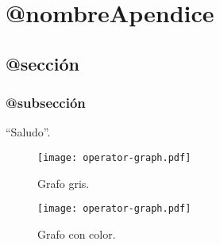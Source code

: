 \chapter{@nombreApendice}
\label{ad:A}


\section{@sección}
\blindtext

\subsection{@subsección}
\Blindtext

``Saludo''.

\begin{figure}[h!]
\centering
\texttt{[image: operator-graph.pdf]}
\caption[Grafo]{Grafo gris.}
\label{imagen:grafo}
\end{figure}

\begin{figure}[h!]
\centering
\texttt{[image: operator-graph.pdf]}
\caption[Grafo coloreado (esto sale en la tabla de contenidos)]{Grafo con color.}
\label{imagen:grafodecolores}
\end{figure}
